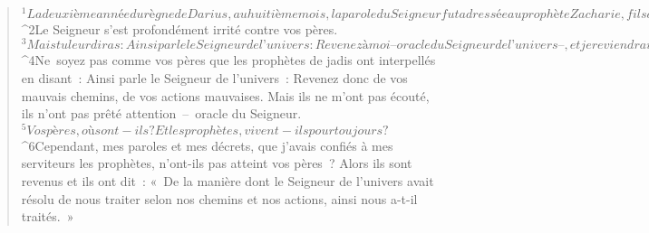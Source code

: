   
  
    
      
         
      \bchapter{}
      \begin{verse}
${}^{1}La deuxième année du règne de Darius, au huitième mois, la parole du Seigneur fut adressée au prophète Zacharie, fils de Bèrèkya, fils de Iddo, pour qu’il dise : 
${}^{2}Le Seigneur s’est profondément irrité contre vos pères. 
${}^{3}Mais tu leur diras : Ainsi parle le Seigneur de l’univers : Revenez à moi – oracle du Seigneur de l’univers –, et je reviendrai à vous, dit le Seigneur de l’univers. 
${}^{4}Ne soyez pas comme vos pères que les prophètes de jadis ont interpellés en disant : Ainsi parle le Seigneur de l’univers : Revenez donc de vos mauvais chemins, de vos actions mauvaises. Mais ils ne m’ont pas écouté, ils n’ont pas prêté attention – oracle du Seigneur. 
${}^{5}Vos pères, où sont-ils ? Et les prophètes, vivent-ils pour toujours ? 
${}^{6}Cependant, mes paroles et mes décrets, que j’avais confiés à mes serviteurs les prophètes, n’ont-ils pas atteint vos pères ? Alors ils sont revenus et ils ont dit : « De la manière dont le Seigneur de l’univers avait résolu de nous traiter selon nos chemins et nos actions, ainsi nous a-t-il traités. »
      

\end{verse}
